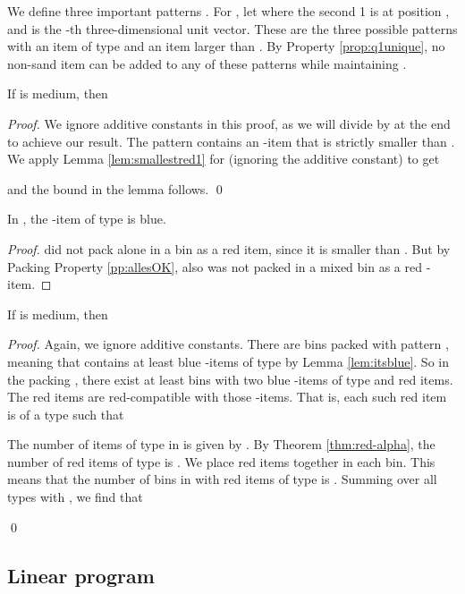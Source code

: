 We define three important patterns .
For , let  where the second 1 is at position , and
 is the -th three-dimensional unit vector. 
These are the three possible patterns with an item of type  and an item larger than .
By Property \ref{prop:q1unique}, 
no non-sand item can be added to any of these patterns while maintaining .


\begin{lemma}
	\label{lem:q1fv}
	If { is medium},
	then 
\end{lemma}
\begin{proof}
	We ignore additive constants in this proof, as we will divide by 
	 at the end to achieve our result.	
	The pattern  contains an -item that is strictly smaller than
	. 
	We apply Lemma \ref{lem:smallestred1} for  (ignoring the additive constant) to get
	
	and the bound in the lemma follows.
	\qed\end{proof}



\begin{lemma}
	\label{lem:itsblue}
	In , the -item  of type  is blue.
\end{lemma}
\begin{proof}
	{\EHarm} did not pack  alone in a bin as a red item, since it is smaller than .
	But by Packing Property \ref{pp:allesOK},  also was not packed in a mixed bin as a red -item.
\end{proof}

\begin{lemma}
	\label{lem:q2fv}
	If  is medium, then
	 
\end{lemma}
\begin{proof}
	Again, we ignore additive constants.
	There are  bins packed with pattern , meaning that
 	 contains at least  blue -items of type 
	by Lemma \ref{lem:itsblue}. So in the packing , there exist
	at least  bins with two blue -items of type 
	and red items. The red items are red-compatible with those -items.
	That is, each such red item is of a type  such that 
	
	The number of items of type  in  is given by
	.
	By Theorem \ref{thm:red-alpha}, the number of red items of type  is .
We place  red items together in each bin.
	This means that the number of bins in  with red items of type 
	is .
Summing over all types  with , we find that
	
	\qed\end{proof}

\subsection{Linear program}

